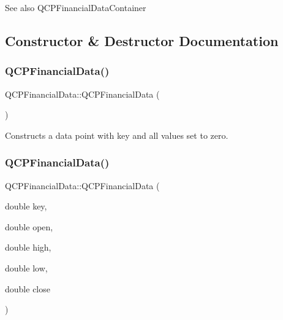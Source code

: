 \begin{DoxySeeAlso}{See also}
Q\+C\+P\+Financial\+Data\+Container 
\end{DoxySeeAlso}


\subsection{Constructor \& Destructor Documentation}
\mbox{\label{classQCPFinancialData_a1ca53b3a9ae4e9658a4fd1ca57d76ba4}} 
\subsubsection{\texorpdfstring{Q\+C\+P\+Financial\+Data()}{QCPFinancialData()}\hspace{0.1cm}{\footnotesize\ttfamily [1/2]}}
{\footnotesize\ttfamily Q\+C\+P\+Financial\+Data\+::\+Q\+C\+P\+Financial\+Data (\begin{DoxyParamCaption}{ }\end{DoxyParamCaption})}

Constructs a data point with key and all values set to zero. \mbox{\label{classQCPFinancialData_a069b72c514dfd4fc8e1d5df811e54ca4}} 
\subsubsection{\texorpdfstring{Q\+C\+P\+Financial\+Data()}{QCPFinancialData()}\hspace{0.1cm}{\footnotesize\ttfamily [2/2]}}
{\footnotesize\ttfamily Q\+C\+P\+Financial\+Data\+::\+Q\+C\+P\+Financial\+Data (\begin{DoxyParamCaption}\item[{double}]{key,  }\item[{double}]{open,  }\item[{double}]{high,  }\item[{double}]{low,  }\item[{double}]{close }\end{DoxyParamCaption})}

